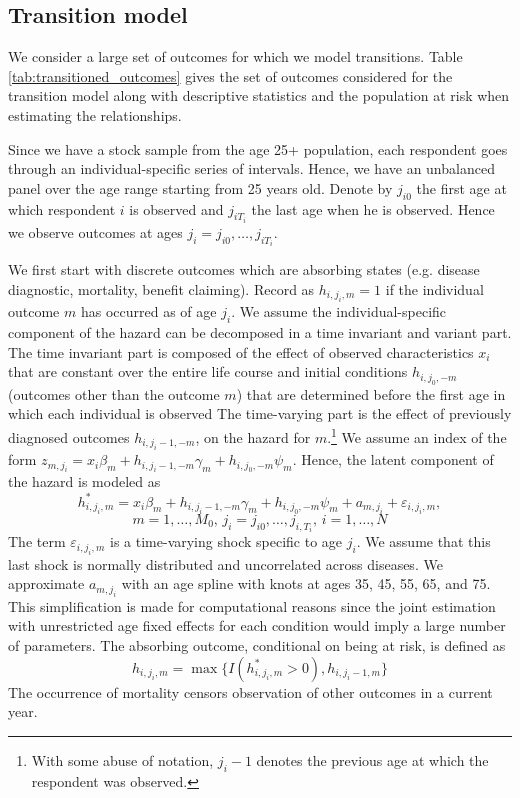\subsection{Transition model}
\label{sec:estimation_transition_model} 
We consider a large set of outcomes for which we model transitions. Table 
\ref{tab:transitioned_outcomes} gives the set of outcomes considered for the 
transition model along with descriptive statistics and the population at risk 
when estimating the relationships. 

Since we have a stock sample from the age 25+ population, each respondent goes 
through an individual-specific series of intervals. Hence, we have an 
unbalanced panel over the age range starting from 25 years old. Denote by 
$j_{i0}$ the first age at which respondent $i$ is observed and $j_{iT_i}$ the 
last age when he is observed. Hence we observe outcomes at ages 
$j_i = j_{i0},\ldots,j_{iT_i}$. 

We first start with discrete outcomes which are absorbing states (e.g. disease 
diagnostic, mortality, benefit claiming). Record as $h_{i,j_i,m}=1$ if the 
individual outcome $m$ has occurred as of age $j_i$. We assume the 
individual-specific component of the hazard can be decomposed in a time 
invariant and variant part. The time invariant part is composed of the effect of 
observed characteristics $x_i$ that are constant over the entire life course and 
initial conditions $h_{i,j_0,-m}$ (outcomes other than the outcome 
$m$) that are determined before the first age in which each individual is observed
The time-varying part is the effect of previously diagnosed outcomes $h_{i,j_i-1,-m}$, 
on the hazard for $m$.\footnote{With some abuse of notation, $j_i-1$ denotes 
the previous age at which the respondent was observed.}  We assume an index of 
the form  $z_{m,j_i} = x_i\beta_m + h_{i,j_i-1,-m} \gamma_m + h_{i,j_0,-m}\psi_m$. Hence, the 
latent component of the hazard is modeled as 
\begin{equation}
h^*_{i,j_i,m}= x_i\beta_m + h_{i,j_i-1,-m} \gamma_m + h_{i,j_0,-m}\psi_m + a_{m,j_i} + \varepsilon_{i,j_i,m},
\label{eqn:transition_hzd_latent}
\end{equation}
\[
m = 1,\ldots,M_0 \mbox{, } j_i = j_{i0},\ldots,j_{i,T_i} \mbox{, } i=1,\ldots,N
\]
The term $\varepsilon_{i,j_i,m}$ is a time-varying shock specific to age $j_i$. 
We assume that this last shock is normally distributed and uncorrelated across 
diseases.  We approximate $a_{m,j_i}$ with an age spline with knots at ages 35, 45,
55, 65, and 75.
This simplification is made 
for computational reasons since the joint estimation with unrestricted age fixed 
effects for each condition would imply a large number of parameters.  The 
absorbing outcome, conditional on being at risk, is defined as 
\[
h_{i,j_i,m} = \max\{I(h^*_{i,j_i,m} > 0), h_{i,j_i-1,m}\}
\]
The occurrence of mortality censors observation of other 
outcomes in a current year. 

